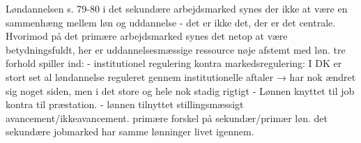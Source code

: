 Løndannelsen s. 79-80
	i det sekundære arbejdsmarked synes der ikke at være en sammenhæng mellem løn og uddannelse - det er ikke det, der er det centrale. Hvorimod på det primære arbejdsmarked synes det netop at være betydningsfuldt, her er uddannelsesmæssige ressource nøje afstemt med løn. 
	tre forhold spiller ind:
	- institutionel regulering kontra markedsregulering: I DK er stort set al løndannelse reguleret gennem institutionelle aftaler 
	→ har nok ændret sig noget siden, men i det store og hele nok stadig rigtigt
	- Lønnen knyttet til job kontra til præstation.
	- lønnen tilnyttet stillingsmæssigt avancement/ikkeavancement. primære forskel på sekundær/primær løn. det sekundære jobmarked har samme lønninger livet igennem. 







































\fi



